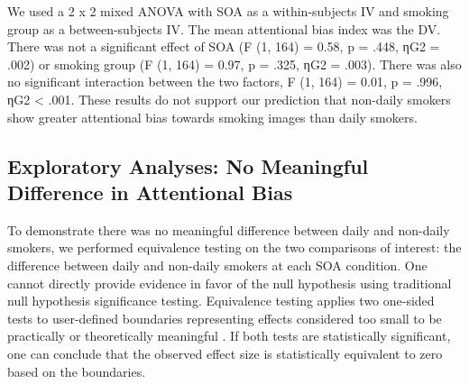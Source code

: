 \documentclass[empirical, authordate]{jote-new-article}
\begin{document}
We used a 2 x 2 mixed ANOVA with SOA as a within-subjects IV and smoking group as a between-subjects IV. The mean attentional bias index was the DV. There was not a significant effect of SOA (F (1, 164) = 0.58, p = .448, ηG2 = .002) or smoking group (F (1, 164) = 0.97, p = .325, ηG2 = .003). There was also no significant interaction between the two factors, F (1, 164) = 0.01, p = .996, ηG2 < .001. These results do not support our prediction that non-daily smokers show greater attentional bias towards smoking images than daily smokers.


























\subsection{Exploratory Analyses: No Meaningful Difference in Attentional Bias}

To demonstrate there was no meaningful difference between daily and non-daily smokers, we performed equivalence testing on the two comparisons of interest: the difference between daily and non-daily smokers at each SOA condition. One cannot directly provide evidence in favor of the null hypothesis using traditional null hypothesis significance testing. Equivalence testing applies two one-sided tests to user-defined boundaries representing effects considered too small to be practically or theoretically meaningful \parencite{Lakens2018}. If both tests are statistically significant, one can conclude that the observed effect size is statistically equivalent to zero based on the boundaries.
\end{document}
